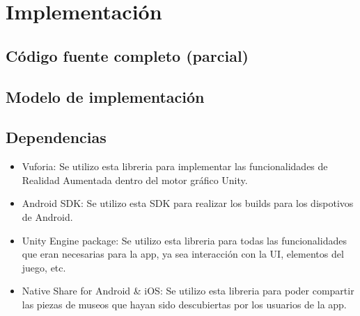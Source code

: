 \section{Implementación}
\subsection{Código fuente completo (parcial)}
\subsection{Modelo de implementación}

\subsection{Dependencias}

\begin{itemize}

\item Vuforia: Se utilizo esta libreria para implementar las funcionalidades de Realidad Aumentada dentro del motor gráfico Unity.

\item Android SDK: Se utilizo esta SDK para realizar los builds para los dispotivos de Android.

\item Unity Engine package: Se utilizo esta libreria para todas las funcionalidades que eran necesarias para la app, ya sea interacción con la UI, elementos del juego, etc.

\item Native Share for Android & iOS: Se utilizo esta libreria para poder compartir las piezas de museos que hayan sido descubiertas por los usuarios de la app.


\end{itemize}